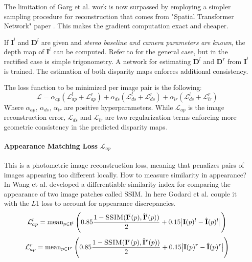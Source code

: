 The limitation of Garg et al. work is now surpassed by employing a simpler sampling procedure for reconstruction that comes from "Spatial Transformer Network" paper \cite{STN}.
This makes the gradient computation exact and cheaper.

If $\mathbf{I}^{l}$ and $\mathbf{D}^{l}$ are given and \textit{stereo baseline and camera parameters are known}, the depth map of $\mathbf{I}^{l}$ can be computed.
Refer to \cite{multiview} for the general case, but in the rectified case is simple trigonometry.
A network for estimating $\mathbf{D}^{l}$ and $\mathbf{D}^{r}$ from $\mathbf{I}^{l}$ is trained.
The estimation of both disparity maps enforces additional consistency.

The loss function to be minimized per image pair is the following:
\[
	\mathcal{L} = \alpha_{ap}(\mathcal{L}_{ap}^{l} + \mathcal{L}_{ap}^{r}) +
		\alpha_{ds}(\mathcal{L}_{ds}^{l} + \mathcal{L}_{ds}^{r}) +
		\alpha_{lr}(\mathcal{L}_{ds}^{l} + \mathcal{L}_{lr}^{r}) 
\]
Where $\alpha_{ap}$, $\alpha_{ds}$, $\alpha_{lr}$ are positive hyperparameters.
While $\mathcal{L}_{ap}$ is the image reconstruction error, $\mathcal{L}_{ds}$ and $\mathcal{L}_{lr}$ are two regularization terms enforcing more geometric consistency in the predicted disparity maps.

\paragraph{Appearance Matching Loss $\mathcal{L}_{ap}$} This is a photometric image reconstruction loss, meaning that penalizes pairs of images appearing too different locally.
How to measure similarity in appearance?
In \cite{SSIM} Wang et al. developed a differentiable similarity index for comparing the appearance of two image patches called \textsc{SSIM}.
In here Godard et al. couple it with the $L1$ loss to account for appearance discrepancies.
\[
	\mathcal{L}_{ap}^{l} = \text{mean}_{p \in \mathbf{I}^{l}}
		\left(
			0.85 \frac{
				1 - \textsc{SSIM} (\mathbf{I}^{l}(p), \hat{\mathbf{I}}^{l}(p))
			}{2} +
			0.15 \big| \mathbf{I}(p)^{l} - \hat{\mathbf{I}}(p)^{l} \big|
		\right)
\]\[
	\mathcal{L}_{ap}^{r} = \text{mean}_{p \in \mathbf{I}^{r}}
		\left(
			0.85 \frac{
				1 - \textsc{SSIM} (\mathbf{I}^{r}(p), \hat{\mathbf{I}}^{r}(p))
			}{2} +
			0.15 \big| \mathbf{I}(p)^{r} - \hat{\mathbf{I}}(p)^{r} \big|
		\right)
\]

